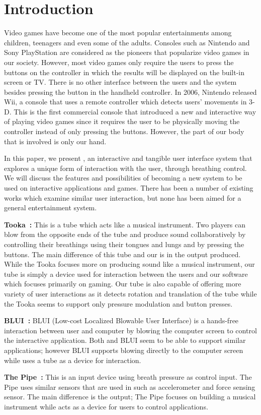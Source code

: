 \section{Introduction}\label{sec:intro}

Video games have become one of the most popular entertainments among children, teenagers and even some of the adults. Consoles such as Nintendo and Sony PlayStation are considered as the pioneers that popularize video games in our society. However, most video games only require the users to press the buttons on the controller in which the results will be displayed on the built-in screen or TV. There is no other interface between the users and the system besides pressing the button in the handheld controller. In 2006, Nintendo released Wii, a console that uses a remote controller which detects users’ movements in 3-D. This is the first commercial console that introduced a new and interactive way of playing video games since it requires the user to be physically moving the controller instead of only pressing the buttons. However, the part of our body that is involved is only our hand. 

In this paper, we present \tube, an interactive and tangible user interface system that explores a unique form of interaction with the user, \ie through breathing control. We will discuss the features and possibilities of \tube becoming a new system to be used on interactive applications and games. There has been a number of existing works which examine similar user interaction, but none has been aimed for a general entertainment system.

\textbf{Tooka~\cite{tooka}:} This is a tube which acts like a musical instrument. Two players can blow from the opposite ends of the tube and produce sound collaboratively by controlling their breathings using their tongues and lungs and by pressing the buttons. The main difference of this tube and our \tube is in the output produced. While the Tooka focuses more on producing sound like a musical instrument, our tube is simply a device used for interaction between the users and our software which focuses primarily on gaming. Our tube is also capable of offering more variety of user interactions as it detects rotation and translation of the tube while the Tooka seems to support only pressure modulation and button presses.

\textbf{BLUI~\cite{blui}:} BLUI (Low-cost Localized Blowable User Interface) is a hands-free interaction between user and computer by blowing the computer screen to control the interactive application. Both \tube and BLUI seem to be able to support similar applications; however BLUI supports blowing directly to the computer screen while \tube uses a tube as a device for interaction.

\textbf{The Pipe~\cite{thepipe}:} This is an input device using breath pressure as control input. The Pipe uses similar sensors that are used in \tube such as accelerometer and force sensing sensor. The main difference is the output; The Pipe focuses on building a musical instrument while \tube acts as a device for users to control applications.

